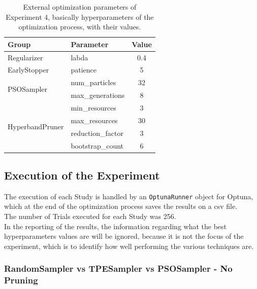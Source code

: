 \begin{table}[ht!]
	\center
	\setlength{\tabcolsep}{0.5cm}
	\caption[Optimization External Parameters of Experiment 4]{External optimization parameters of Experiment 4, basically hyperparameters of the optimization process, with their values.}
	\begin{tabular}{@{}llc@{}}
		\toprule
		\textbf{Group}                   & \textbf{Parameter} & \textbf{Value} \\ \midrule
		Regularizer                      & labda              & 0.4            \\[0.1cm]
		EarlyStopper                     & patience           & 5              \\[0.2cm]
		\multirow{2}{*}{PSOSampler}      & num\_particles     & 32             \\[0.1cm]
										 & max\_generations   & 8              \\[0.2cm]
		\multirow{4}{*}{HyperbandPruner} & min\_resources     & 3              \\[0.1cm]
										 & max\_resources     & 30             \\[0.1cm]
										 & reduction\_factor  & 3              \\[0.1cm]
										 & bootstrap\_count   & 6              \\ \bottomrule
	\end{tabular}
	\label{tab:table-4.4.2}
\end{table}

\subsection{Execution of the Experiment}

The execution of each Study is handled by an \texttt{OptunaRunner} object for Optuna, which at the end of the optimization process saves the results on a csv file.
\\[0.3cm]The number of Trials executed for each Study was 256.
\\[0.3cm]In the reporting of the results, the information regarding what the best hyperparameters values are will be ignored, because it is not the focus of the experiment, which is to identify how well performing the various techniques are.

\subsubsection{RandomSampler  vs  TPESampler  vs  PSOSampler  -  No Pruning}

